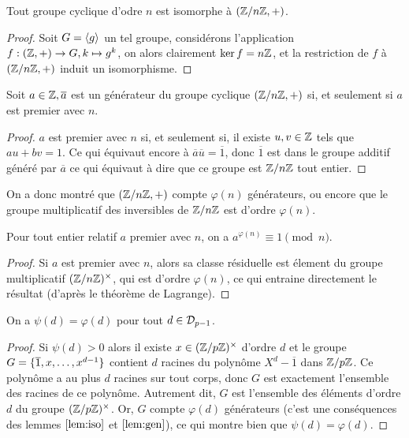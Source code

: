 \begin{lem}
\label{lem:iso}
Tout groupe cyclique d'odre $n$ est isomorphe à $\left( \mathbb{Z}/n\mathbb{Z}, + \right)$.
\end{lem}

\begin{proof}
Soit $G = \langle g\rangle$ un tel groupe, considérons l'application $f : (\mathbb{Z}, +) \to G, k \mapsto g^k$,
on alors clairement $\ker{f}=n\mathbb{Z}$, et la restriction de $f$ à $\left( \mathbb{Z}/n\mathbb{Z}, + \right)$ induit un isomorphisme. 
\end{proof}

\begin{lem}
\label{lem:gen}
Soit $a \in \mathbb{Z}, \overline{a}$ est un générateur du groupe cyclique $\left( \mathbb{Z}/n\mathbb{Z}, + \right)$ si, et seulement si $a$ est premier avec $n$.
\end{lem}

\begin{proof}
$a$ est premier avec $n$ si, et seulement si, il existe $u, v \in \mathbb{Z}$ tels que $au+bv=1$.
Ce qui équivaut encore à $\overline{a}\overline{u}=\overline{1}$, donc $\overline{1}$ est dans le groupe additif généré par 
$\overline{a}$ ce qui équivaut à dire que ce groupe est $\mathbb{Z}/n\mathbb{Z}$ tout entier.
\end{proof}

\begin{rmq}
On a donc montré que $\left( \mathbb{Z}/n\mathbb{Z}, + \right)$ compte $\varphi(n)$ générateurs, ou encore que le groupe multiplicatif des inversibles
de $\mathbb{Z}/n\mathbb{Z}$ est d'ordre $\varphi(n)$.
\end{rmq}


\begin{lem}
Pour tout entier relatif $a$ premier avec $n$, on a $a^{\varphi(n)} \equiv 1 \pmod n$.
\end{lem}

\begin{proof}
Si $a$ est premier avec $n$, alors sa classe résiduelle est élement du groupe multiplicatif $(\mathbb{Z}/n\mathbb{Z})^{\times}$, 
qui est d'ordre $\varphi(n)$, ce qui entraine directement le résultat (d'après le théorème de Lagrange). 
\end{proof}

\begin{lem}
On a $\psi(d) = \varphi(d)$ pour tout $d \in \mathcal{D}_{p-1}$.
\end{lem}

\begin{proof}
Si $\psi(d) >0$ alors il existe $x \in (\mathbb{Z}/p\mathbb{Z})^{\times}$ d'ordre $d$ et le groupe $G = \{ \overline{1}, x, \dots, x^{d-1} \}$ contient $d$ racines 
du polynôme $X^d - \overline{1}$ dans $\mathbb{Z}/p\mathbb{Z}$. Ce polynôme a au plus $d$ racines sur tout corps, donc $G$ est exactement l'ensemble
des racines de ce polynôme. Autrement dit, $G$ est l'ensemble des éléments d'ordre $d$ du groupe $(\mathbb{Z}/p\mathbb{Z})^{\times}$.
Or, $G$ compte $\varphi(d)$ générateurs (c'est une conséquences des lemmes $\ref{lem:iso}$ et $\ref{lem:gen}$), 
ce qui montre bien que $\psi(d) = \varphi(d)$.
\end{proof}

